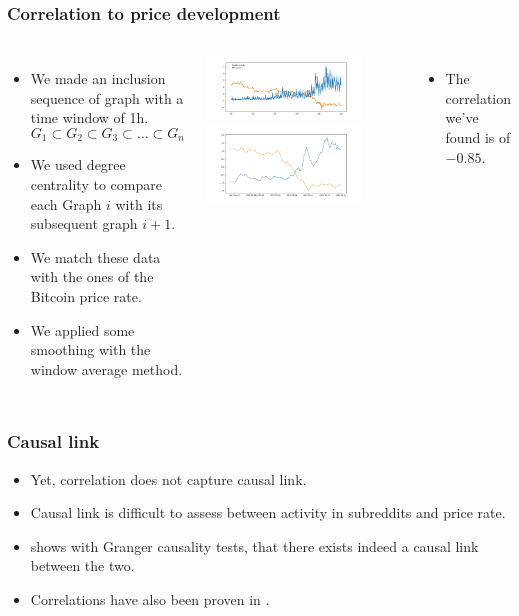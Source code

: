 \documentclass[aspectratio=169]{beamer}
\begin{document}
\begin{frame}[t]
    \frametitle{Correlation to price development}
    \begin{columns}
        \begin{itemize}
            \item We made an inclusion sequence of graph with a time window of 1h.
                $$G_1\subset G_2\subset G_3\subset \ldots\subset G_n$$
            \item We used degree centrality to compare each Graph $i$ with its subsequent graph $i+1$.
            \item We match these data with the ones of the Bitcoin price rate.
            \item We applied some smoothing with the window average method.
        \end{itemize}
        \includegraphics[width=0.8\textwidth]{figures/activity_x_price.pdf}
        \includegraphics[width=0.8\textwidth]{figures/pearson.pdf}
        \begin{itemize}
            \item The correlation we've found is of $-0.85$.
        \end{itemize}
    \end{columns}
\end{frame}
\begin{frame}[t]
    \frametitle{Causal link}
    \vspace{1.0cm}
\begin{itemize}
    \item Yet, correlation does not capture causal link.
    \item Causal link is difficult to assess between activity in subreddits and price rate.
    \item {} shows with Granger causality tests, that there exists indeed a causal link between the two.
    \item Correlations have also been proven in .
\end{itemize}
\end{frame}
\end{document}

